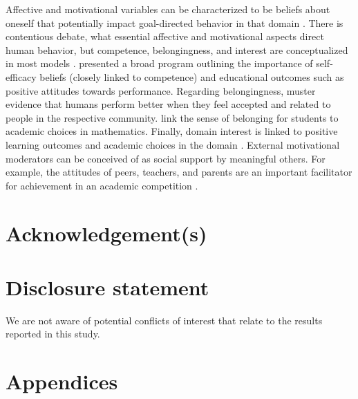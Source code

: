 \documentclass[]{interact}
\begin{document}
Affective and motivational variables can be characterized to be beliefs about oneself that potentially impact goal-directed behavior in that domain \citep{Rheinberg.2012}. There is contentious debate, what essential affective and motivational aspects direct human behavior, but competence, belongingness, and interest are conceptualized in most models \cite{Deci.2000,Hazari.2010}. \cite{Bandura.1997} presented a broad program outlining the importance of self-efficacy beliefs (closely linked to competence) and educational outcomes such as positive attitudes towards performance. Regarding belongingness, \cite{Baumeister.1995} muster evidence that humans perform better when they feel accepted and related to people in the respective community. \cite{Good.2012} link the sense of belonging for students to academic choices in mathematics. Finally, domain interest is linked to positive learning outcomes and academic choices in the domain \cite{Krapp.2002,Hazari.2010}. External motivational moderators can be conceived of as social support by meaningful others. For example, the attitudes of peers, teachers, and parents are an important facilitator for achievement in an academic competition \cite[e.g.,][]{Urhahne.2012}.



%

%

%

%


\section*{Acknowledgement(s)}


\section*{Disclosure statement}

We are not aware of potential conflicts of interest that relate to the results reported in this study.



\newpage





\newpage
\section{Appendices}

\appendix
\end{document}
